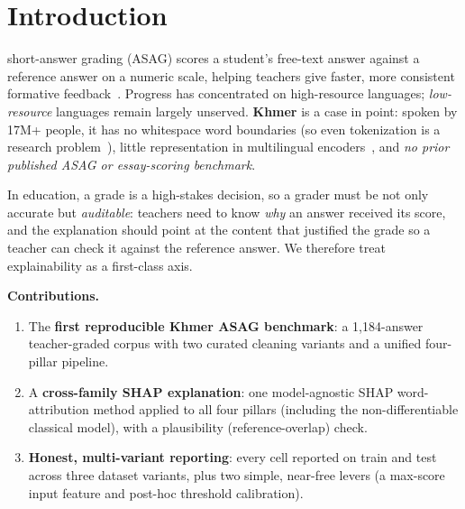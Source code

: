 \documentclass[journal]{IEEEtran}
\begin{document}
\section{Introduction}
 short-answer grading (ASAG) scores a student's free-text answer
against a reference answer on a numeric scale, helping teachers give faster, more consistent
formative feedback~\cite{mohler2011,sung2022survey}. Progress has concentrated on high-resource
languages; \emph{low-resource} languages remain largely unserved. \textbf{Khmer} is a case in
point: spoken by 17M+ people, it has no whitespace word boundaries (so even tokenization is a
research problem~\cite{khmernltk2020}), little representation in multilingual
encoders~\cite{buoy2022khmer}, and \emph{no prior published ASAG or
essay-scoring benchmark}.

In education, a grade is a high-stakes decision, so a grader must be not only accurate but
\emph{auditable}: teachers need to know \emph{why} an answer received its score, and the
explanation should point at the content that justified the grade so a teacher can check it against
the reference answer. We therefore treat explainability as a first-class axis.

\noindent\textbf{Contributions.}
\begin{enumerate}
\item The \textbf{first reproducible Khmer ASAG benchmark}: a 1{,}184-answer teacher-graded
corpus with two curated cleaning variants and a unified four-pillar pipeline.
\item A \textbf{cross-family SHAP explanation}: one model-agnostic SHAP word-attribution method
applied to all four pillars (including the non-differentiable classical model), with a plausibility
(reference-overlap) check.
\item \textbf{Honest, multi-variant reporting}: every cell reported on train and test across three
dataset variants, plus two simple, near-free levers (a max-score input feature and post-hoc
threshold calibration).
\end{enumerate}
\end{document}
